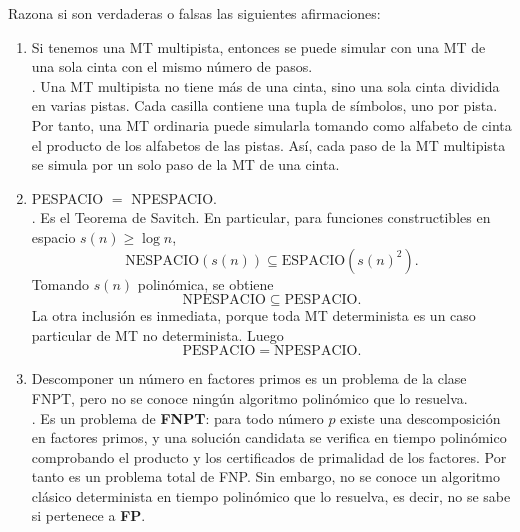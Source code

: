 \documentclass[12pt]{article}
\begin{document}
    \begin{ejercicio}[2.4 puntos]
        Razona si son verdaderas o falsas las siguientes afirmaciones:
        \begin{enumerate}
            \item Si tenemos una MT multipista, entonces se puede simular con una MT de una sola cinta con el mismo número de pasos. \\
            
            . Una MT multipista no tiene más de una cinta, sino una sola cinta dividida en varias pistas. 
            Cada casilla contiene una tupla de símbolos, uno por pista. Por tanto, una MT ordinaria puede simularla tomando como 
            alfabeto de cinta el producto de los alfabetos de las pistas. Así, cada paso de la MT multipista se simula por un solo 
            paso de la MT de una cinta.
            
            \item PESPACIO $=$ NPESPACIO. \\
            
            . Es el Teorema de Savitch. En particular, para funciones constructibles en espacio $s(n)\geq \log n$,
            $$
            \text{NESPACIO}(s(n))\subseteq \text{ESPACIO}(s(n)^2).
            $$
            Tomando $s(n)$ polinómica, se obtiene
            $$
            \text{NPESPACIO}\subseteq \text{PESPACIO}.
            $$
            La otra inclusión es inmediata, porque toda MT determinista es un caso particular de MT no determinista. Luego
            $$
            \text{PESPACIO}=\text{NPESPACIO}.
            $$
            
            \item Descomponer un número en factores primos es un problema de la clase FNPT, pero no se conoce ningún algoritmo 
            polinómico que lo resuelva. \\

            . Es un problema de \textbf{FNPT}: para todo número $p$
            existe una descomposición en factores primos, y una solución candidata se
            verifica en tiempo polinómico comprobando el producto y los certificados de
            primalidad de los factores. Por tanto es un problema total de FNP. Sin embargo,
            no se conoce un algoritmo clásico determinista en tiempo polinómico que lo
            resuelva, es decir, no se sabe si pertenece a \textbf{FP}.
            

\end{enumerate}
\end{ejercicio}
\end{document}
